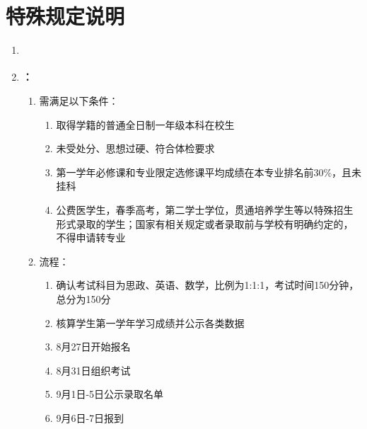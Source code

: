 \section[特殊说明]{特殊规定说明}
\begin{enumerate}
      \item \textbf{}
      \item \textbf{\footnotemark：}
            \begin{enumerate}
                  \item 需满足以下条件：
                        \begin{enumerate}
                              \item 取得学籍的普通全日制一年级本科在校生
                              \item 未受处分、思想过硬、符合体检要求
                              \item 第一学年必修课和专业限定选修课平均成绩在本专业排名前30\%，且未挂科
                              \item 公费医学生，春季高考，第二学士学位，贯通培养学生等以特殊招生形式录取的学生；国家有相关规定或者录取前与学校有明确约定的，不得申请转专业
                        \end{enumerate}
                  \item 流程：
                        \begin{enumerate}
                              \item 确认考试科目为思政、英语、数学，比例为1:1:1，考试时间150分钟，总分为150分
                              \item 核算学生第一学年学习成绩并公示各类数据
                              \item 8月27日开始报名
                              \item 8月31日组织考试
                              \item 9月1日-5日公示录取名单\footnotemark
                              \item 9月6日-7日报到
                        \end{enumerate}
            \end{enumerate}

\end{enumerate}
